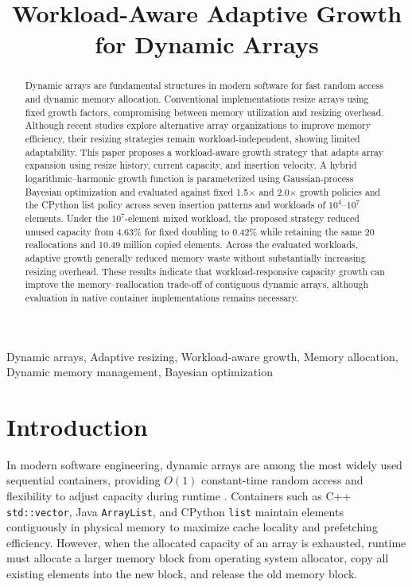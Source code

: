 \documentclass[conference]{IEEEtran}
\begin{document}
\title{Workload-Aware Adaptive Growth for Dynamic Arrays}



\maketitle

\begin{abstract}
Dynamic arrays are fundamental structures in modern software for fast random access and dynamic memory allocation. Conventional implementations resize arrays using fixed growth factors, compromising between memory utilization and resizing overhead. Although recent studies explore alternative array organizations to improve memory efficiency, their resizing strategies remain workload-independent, showing limited adaptability. This paper proposes a workload-aware growth strategy that adapts array expansion using resize history, current capacity, and insertion velocity. A hybrid logarithmic--harmonic growth function is parameterized using Gaussian-process Bayesian optimization and evaluated against fixed 1.5$\times$ and 2.0$\times$ growth policies and the CPython list policy across seven insertion patterns and workloads of $10^4$--$10^7$ elements. Under the $10^7$-element mixed workload, the proposed strategy reduced unused capacity from 4.63\% for fixed doubling to 0.42\% while retaining the same 20 reallocations and 10.49 million copied elements. Across the evaluated workloads, adaptive growth generally reduced memory waste without substantially increasing resizing overhead. These results indicate that workload-responsive capacity growth can improve the memory--reallocation trade-off of contiguous dynamic arrays, although evaluation in native container implementations remains necessary.
\end{abstract}

\begin{IEEEkeywords}
Dynamic arrays, Adaptive resizing, Workload-aware growth, Memory allocation, Dynamic memory management, Bayesian optimization
\end{IEEEkeywords}

\section{Introduction}
In modern software engineering, dynamic arrays are among the most widely used sequential containers, providing $O(1)$ constant-time random access and flexibility to adjust capacity during runtime \cite{cormen_algorithms}. Containers such as C++ \texttt{std::vector}, Java \texttt{ArrayList}, and CPython \texttt{list} maintain elements contiguously in physical memory to maximize cache locality and prefetching efficiency. However, when the allocated capacity of an array is exhausted, runtime must allocate a larger memory block from operating system allocator, copy all existing elements into the new block, and release the old memory block.
\end{document}
